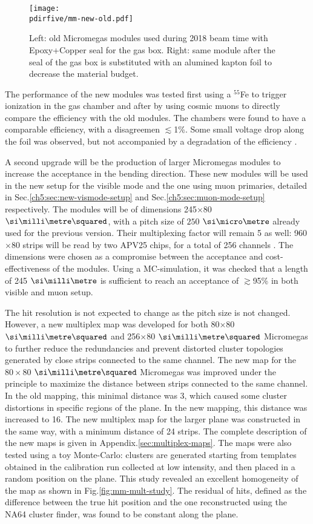 \begin{figure}[bth!]
  \centering
  \texttt{[image: \\pdirfive/mm-new-old.pdf]}
  \caption[old and new Micromegas design of the gas box seal]{Left: old Micromegas modules used during 2018 beam time with Epoxy+Copper seal for the gas box. Right: same module after the seal of the gas box is substituted with an alumined kapton foil to decrease the material budget.}
  \label{fig:mm-old-new}
\end{figure}

The performance of the new modules was tested first using a $^{55}$Fe to trigger ionization in the gas chamber and after by using cosmic muons to directly compare the efficiency with the old modules. The chambers were found to have a comparable efficiency, with a disagreemen $\lesssim$1\%. Some small voltage drop along the foil was observed, but not accompanied by a degradation of the efficiency \cite{philip-swork}.

A second upgrade will be the production of larger Micromegas modules to increase the acceptance in the bending direction. These new modules will be used in the new setup for the visible mode and the one using muon primaries, detailed in Sec.\ref{ch5:sec:new-vismode-setup} and Sec.\ref{ch5:sec:muon-mode-setup} respectively. The modules will be of dimensions 245$\times$80 $\mms$, with a pitch size of $250$ $\mum$ already used for the previous version. Their multiplexing factor will remain 5 as well:  960$\times$80 strips will be read by two APV25 chips, for a total of 256 channels \cite{apv-useguide}. The dimensions were chosen as a compromise between the acceptance and cost-effectiveness of the modules. Using a MC-simulation, it was checked that a length of 245 $\mmi$ is sufficient to reach an acceptance of $\gtrsim$95\% in both visible and muon setup.

The hit resolution is not expected to change as the pitch size is not changed. However, a new multiplex map was developed for both 80$\times$80 $\mms$ and 256$\times$80 $\mms$ Micromegas to further reduce the redundancies and prevent distorted cluster topologies generated by close strips connected to the same channel. The new map for the $80\times80$ $\mms$ Micromegas was improved under the principle to maximize the distance between strips connected to the same channel. In the old mapping, this minimal distance was 3, which caused some cluster distortions in specific regions of the plane. In the new mapping, this distance was increased to 16. The new multiplex map for the larger plane was constructed in the same way, with a minimum distance of 24 strips. The complete description of the new maps is given in Appendix.\ref{sec:multiplex-maps}. The maps were also tested using a toy Monte-Carlo: clusters are generated starting from templates obtained in the calibration run collected at low intensity, and then placed in a random position on the plane. This study revealed an excellent homogeneity of the map as shown in Fig.\ref{fig:mm-mult-study}. The residual of hits, defined as the difference between the true hit position and the one reconstructed using the NA64 cluster finder, was found to be constant along the plane.

